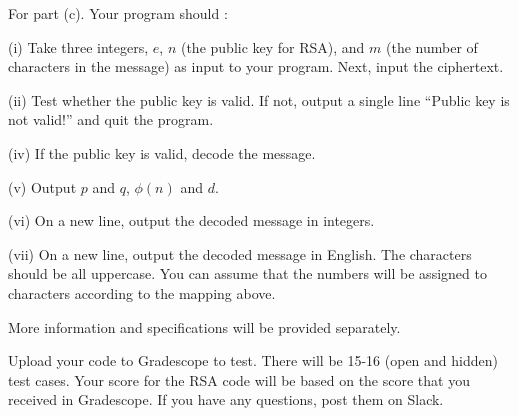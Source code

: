 \documentclass[11pt]{article}
\begin{document}
\begin{problem}
\begin{description}
\end{description}

\vspace{0.2in}
\noindent For part (c). Your program should :
\begin{description}

	\item (i) Take three integers, $e$, $n$ (the public key for RSA), and $m$ (the number of characters in the message) as input to your program. Next, input the ciphertext.
	\item (ii) Test whether the public key is valid. If not, output a single line ``Public key is not valid!'' and quit the program.
	\item (iv) If the public key is valid, decode the message.
	\item (v) Output $p$ and $q$, $\phi(n)$ and $d$.
	\item (vi) On a new line, output the decoded message in integers.
	\item (vii) On a new line, output the decoded message in English. The characters should be all uppercase. You can assume that the numbers will be assigned to characters according to the mapping above.
 
\end{description}

\noindent More information and specifications will be provided separately.

\vspace{0.2in}
\noindent Upload your code to Gradescope to test. There will be 15-16 (open and hidden) test cases.  Your score for the RSA code will be based on the score that you received in Gradescope. If you have any questions, post them on Slack.


\end{problem}
\vspace{0.2in}

\end{document}
